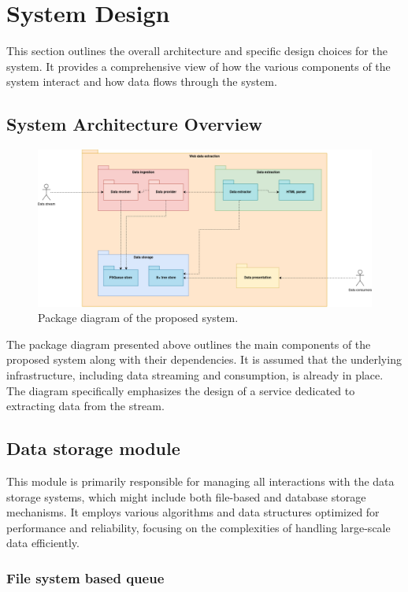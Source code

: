 \section{System Design}
This section outlines the overall architecture and specific design choices for the system. It provides a comprehensive view of how the various components of the system interact and how data flows through the system.

\subsection{System Architecture Overview}

\begin{figure}[h]
\centering
\includegraphics[width=\textwidth]{images/package.png}
\caption{\label{fig:package-diagram} Package diagram of the proposed system.}
\end{figure}

The package diagram presented above outlines the main components of the proposed system along with their dependencies. It is assumed that the underlying infrastructure, including data streaming and consumption, is already in place. The diagram specifically emphasizes the design of a service dedicated to extracting data from the stream.

\subsection{Data storage module}

This module is primarily responsible for managing all interactions with the data storage systems, which might include both file-based and database storage mechanisms. It employs various algorithms and data structures optimized for performance and reliability, focusing on the complexities of handling large-scale data efficiently.

\subsubsection{File system based queue}

